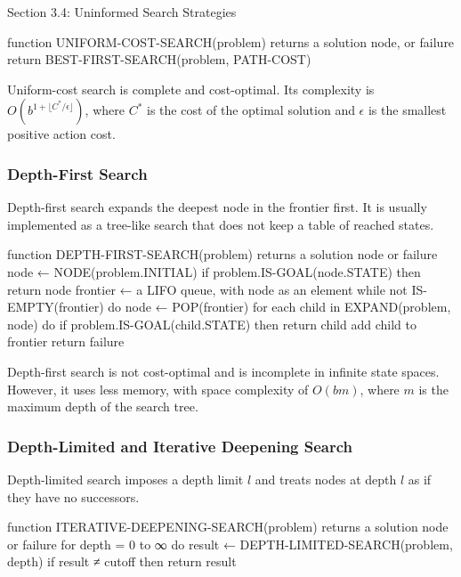 \begin{notes}{Section 3.4: Uninformed Search Strategies}
    \begin{highlight}
    \begin{code}[Pseudo]
    function UNIFORM-COST-SEARCH(problem) returns a solution node, or failure
        return BEST-FIRST-SEARCH(problem, PATH-COST)
    \end{code}
    \end{highlight}

    Uniform-cost search is complete and cost-optimal. Its complexity is $O(b^{1 + \lfloor C^* / \epsilon \rfloor})$, where $C^*$ is the cost of the optimal solution and $\epsilon$ is the 
    smallest positive action cost.

    \subsubsection*{Depth-First Search}

    Depth-first search expands the deepest node in the frontier first. It is usually implemented as a tree-like search that does not keep a table of reached states.

    \begin{highlight}
    \begin{code}[Pseudo]
    function DEPTH-FIRST-SEARCH(problem) returns a solution node or failure
        node ← NODE(problem.INITIAL)
        if problem.IS-GOAL(node.STATE) then return node
        frontier ← a LIFO queue, with node as an element
        while not IS-EMPTY(frontier) do
            node ← POP(frontier)
            for each child in EXPAND(problem, node) do
                if problem.IS-GOAL(child.STATE) then return child
                add child to frontier
        return failure
    \end{code}
    \end{highlight}

    Depth-first search is not cost-optimal and is incomplete in infinite state spaces. However, it uses less memory, with space complexity of $O(bm)$, where $m$ is the maximum depth of the search tree.

    \subsubsection*{Depth-Limited and Iterative Deepening Search}

    Depth-limited search imposes a depth limit $l$ and treats nodes at depth $l$ as if they have no successors.

    \begin{highlight}
    \begin{code}
    function ITERATIVE-DEEPENING-SEARCH(problem) returns a solution node or failure
        for depth = 0 to ∞ do
            result ← DEPTH-LIMITED-SEARCH(problem, depth)
            if result ≠ cutoff then return result


\end{code}
\end{highlight}
\end{notes}
